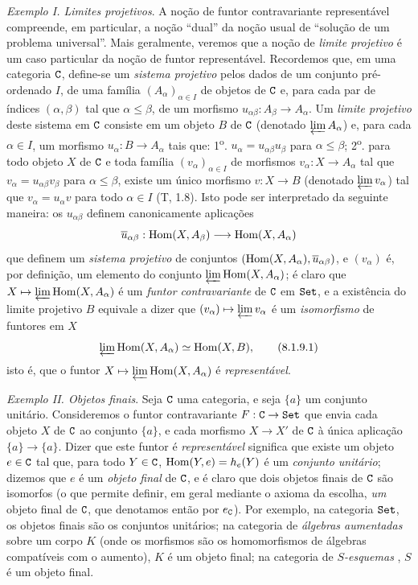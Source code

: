 \begin{env}[8.1.9]
\label{0.8.1.9}
\textit{Exemplo I. Limites projetivos}.
A noção de funtor contravariante representável compreende, em particular, a noção ``dual'' da noção usual de ``solução de um problema universal''.
Mais geralmente, veremos que a noção de \emph{limite projetivo} é um caso particular da noção de funtor representável.
Recordemos que, em uma categoria $\mathtt{C}$, define-se um \emph{sistema projetivo} pelos dados de um conjunto pré-ordenado $I$, de uma família $(A_\alpha)_{\alpha\in I}$ de objetos de $\mathtt{C}$ e, para cada par de índices $(\alpha,\beta)$ tal que $\alpha\leq\beta$, de um morfismo $u_{\alpha\beta}:A_\beta\to A_\alpha$.
Um \emph{limite projetivo} deste sistema em $\mathtt{C}$ consiste em um objeto $B$ de $\mathtt{C}$ (denotado $\varprojlim A_\alpha$) e, para cada $\alpha\in I$, um morfismo $u_\alpha:B\to A_\alpha$ tais que: 1\textsuperscript{o}. $u_\alpha=u_{\alpha\beta}u_\beta$ para $\alpha\leq\beta$; 2\textsuperscript{o}. para todo objeto $X$ de $\mathtt{C}$ e toda família $(v_\alpha)_{\alpha\in I}$ de morfismos $v_\alpha:X\to A_\alpha$ tal que $v_\alpha=u_{\alpha\beta}v_\beta$ para $\alpha\leq\beta$, existe um único morfismo $v:X\to B$ (denotado $\varprojlim v_\alpha$) tal que $v_\alpha=u_\alpha v$ para todo $\alpha\in I$ (T, 1.8).
Isto pode ser interpretado da seguinte maneira: os $u_{\alpha\beta}$ definem canonicamente aplicações
\[
  \overline{u}_{\alpha\beta}:\Hom(X,A_\beta)\to\Hom(X,A_\alpha)
\]
que definem um \emph{sistema projetivo} de conjuntos $(\operatorname{Hom}(X,A_\alpha),\overline{u}_{\alpha\beta})$, e $(v_\alpha)$ é, por definição, um elemento do conjunto $\varprojlim\operatorname{Hom}(X,A_\alpha)$; é claro que $X\mapsto\varprojlim\Hom(X,A_\alpha)$ é um \emph{funtor contravariante} de $\mathtt{C}$ em $\mathtt{Set}$, e a existência do limite projetivo $B$ equivale a dizer que $(v_\alpha)\mapsto\varprojlim v_\alpha$ é um \emph{isomorfismo} de funtores em $X$
\[
  \varprojlim\operatorname{Hom}(X,A_\alpha)\simeq\operatorname{Hom}(X,B),
  \tag{8.1.9.1}
\]
isto é, que o funtor $X\mapsto\varprojlim\Hom(X,A_\alpha)$ é \emph{representável}.
\end{env}

\begin{env}[8.1.10]
\label{0.8.1.10}
\textit{Exemplo II. Objetos finais}.
Seja $\mathtt{C}$ uma categoria, e seja $\{a\}$ um conjunto unitário.
Consideremos o funtor contravariante $F:\C\to\Set$ que envia cada objeto $X$ de $\mathtt{C}$ ao conjunto $\{a\}$, e cada morfismo $X\to X'$ de $\mathtt{C}$ à única aplicação $\{a\}\to\{a\}$.
Dizer que este funtor é \emph{representável} significa que existe um objeto $e\in\mathtt{C}$ tal que, para todo $Y\in\mathtt{C}$, $\operatorname{Hom}(Y,e)=h_e(Y)$ é um \emph{conjunto unitário}; dizemos que $e$ é um \emph{objeto final} de $\mathtt{C}$, e é claro que dois objetos finais de $\mathtt{C}$ são isomorfos (o que permite definir, em geral mediante o axioma da escolha, \emph{um} objeto final de $\mathtt{C}$, que denotamos então por $e_\mathtt{C}$).
Por exemplo, na categoria $\mathtt{Set}$, os objetos finais são os conjuntos unitários; na categoria de \emph{álgebras aumentadas} sobre um corpo $K$ (onde os morfismos são os homomorfismos de álgebras compatíveis com o aumento), $K$ é um objeto final; na categoria de \emph{$S$-esquemas} , $S$ é um objeto final.
\end{env}

